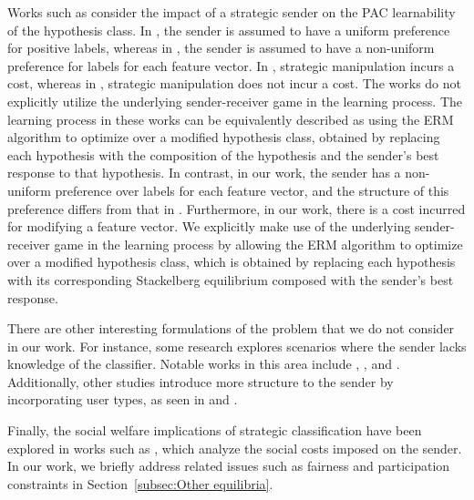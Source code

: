 Works such as \cite{hardt2016strategic,cullina2018pac,zhang2021incentive,sundaram2021pac} consider the impact of a strategic sender on the PAC learnability of the hypothesis class. In \cite{hardt2016strategic,cullina2018pac,zhang2021incentive}, the sender is assumed to have a uniform preference for positive labels, whereas in \cite{sundaram2021pac}, the sender is assumed to have a non-uniform preference for labels for each feature vector. In \cite{hardt2016strategic,cullina2018pac,sundaram2021pac}, strategic manipulation incurs a cost, whereas in \cite{zhang2021incentive}, strategic manipulation does not incur a cost. The works \cite{hardt2016strategic,cullina2018pac,zhang2021incentive,sundaram2021pac} do not explicitly utilize the underlying sender-receiver game in the learning process. The learning process in these works can be equivalently described as using the ERM algorithm to optimize over a modified hypothesis class, obtained by replacing each hypothesis with the composition of the hypothesis and the sender's best response to that hypothesis. In contrast, in our work, the sender has a non-uniform preference over labels for each feature vector, and the structure of this preference differs from that in \cite{sundaram2021pac}. Furthermore, in our work, there is a cost incurred for modifying a feature vector. We explicitly make use of the underlying sender-receiver game in the learning process by allowing the ERM algorithm to optimize over a modified hypothesis class, which is obtained by replacing each hypothesis with its corresponding Stackelberg equilibrium composed with the sender's best response.

There are other interesting formulations of the problem that we do not consider in our work. For instance, some research explores scenarios where the sender lacks knowledge of the classifier. Notable works in this area include \cite{ghalme2021strategic}, \cite{bechavod2022information}, and \cite{cohen2024bayesian}. Additionally, other studies introduce more structure to the sender by incorporating user types, as seen in \cite{jagadeesan2021alternative} and \cite{levanon2022generalized}.

Finally, the social welfare implications of strategic classification have been explored in works such as \cite{milli2019social}, which analyze the social costs imposed on the sender. In our work, we briefly address related issues such as fairness and participation constraints in Section~\ref{subsec:Other equilibria}.





